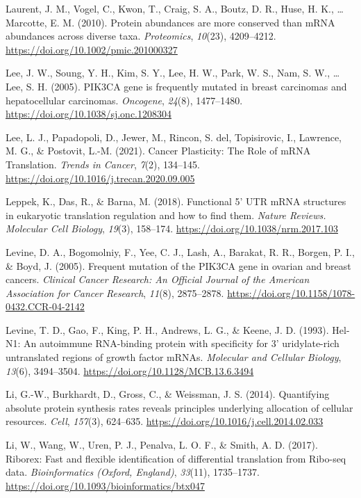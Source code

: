\documentclass[12pt,openany]{book}
\begin{document}
\hypertarget{ref-Laurent2010}{}
Laurent, J. M., Vogel, C., Kwon, T., Craig, S. A., Boutz, D. R., Huse,
H. K., \ldots{} Marcotte, E. M. (2010). Protein abundances are more
conserved than mRNA abundances across diverse taxa. \emph{Proteomics},
\emph{10}(23), 4209--4212. \url{https://doi.org/10.1002/pmic.201000327}

\hypertarget{ref-Lee2005}{}
Lee, J. W., Soung, Y. H., Kim, S. Y., Lee, H. W., Park, W. S., Nam, S.
W., \ldots{} Lee, S. H. (2005). PIK3CA gene is frequently mutated in
breast carcinomas and hepatocellular carcinomas. \emph{Oncogene},
\emph{24}(8), 1477--1480. \url{https://doi.org/10.1038/sj.onc.1208304}

\hypertarget{ref-Lee2021}{}
Lee, L. J., Papadopoli, D., Jewer, M., Rincon, S. del, Topisirovic, I.,
Lawrence, M. G., \& Postovit, L.-M. (2021). Cancer Plasticity: The Role
of mRNA Translation. \emph{Trends in Cancer}, \emph{7}(2), 134--145.
\url{https://doi.org/10.1016/j.trecan.2020.09.005}

\hypertarget{ref-Leppek2018}{}
Leppek, K., Das, R., \& Barna, M. (2018). Functional 5' UTR mRNA
structures in eukaryotic translation regulation and how to find them.
\emph{Nature Reviews. Molecular Cell Biology}, \emph{19}(3), 158--174.
\url{https://doi.org/10.1038/nrm.2017.103}

\hypertarget{ref-Levine2005}{}
Levine, D. A., Bogomolniy, F., Yee, C. J., Lash, A., Barakat, R. R.,
Borgen, P. I., \& Boyd, J. (2005). Frequent mutation of the PIK3CA gene
in ovarian and breast cancers. \emph{Clinical Cancer Research: An
Official Journal of the American Association for Cancer Research},
\emph{11}(8), 2875--2878.
\url{https://doi.org/10.1158/1078-0432.CCR-04-2142}

\hypertarget{ref-Levine1993}{}
Levine, T. D., Gao, F., King, P. H., Andrews, L. G., \& Keene, J. D.
(1993). Hel-N1: An autoimmune RNA-binding protein with specificity for
3' uridylate-rich untranslated regions of growth factor mRNAs.
\emph{Molecular and Cellular Biology}, \emph{13}(6), 3494--3504.
\url{https://doi.org/10.1128/MCB.13.6.3494}

\hypertarget{ref-Li2014}{}
Li, G.-W., Burkhardt, D., Gross, C., \& Weissman, J. S. (2014).
Quantifying absolute protein synthesis rates reveals principles
underlying allocation of cellular resources. \emph{Cell}, \emph{157}(3),
624--635. \url{https://doi.org/10.1016/j.cell.2014.02.033}

\hypertarget{ref-Li2017}{}
Li, W., Wang, W., Uren, P. J., Penalva, L. O. F., \& Smith, A. D.
(2017). Riborex: Fast and flexible identification of differential
translation from Ribo-seq data. \emph{Bioinformatics (Oxford, England)},
\emph{33}(11), 1735--1737.
\url{https://doi.org/10.1093/bioinformatics/btx047}
\end{document}
